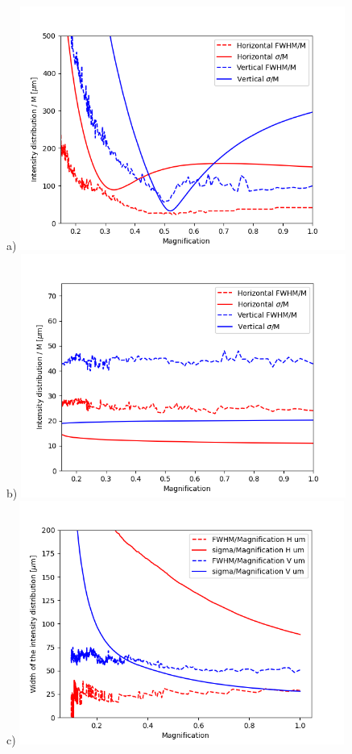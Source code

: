 \documentclass{iucr}              %
\begin{document}
\begin{figure}\label{fig:scan}
\flushleft
\centering
a)
\includegraphics[width=0.95\textwidth]{figures/scan_toroid.png}\\
b)
\includegraphics[width=0.95\textwidth]{figures/scan_diaboloid.png}\\
c)
\includegraphics[width=0.95\textwidth]{figures/scan_parabolic-cone.png}


\end{figure}
\end{document}
